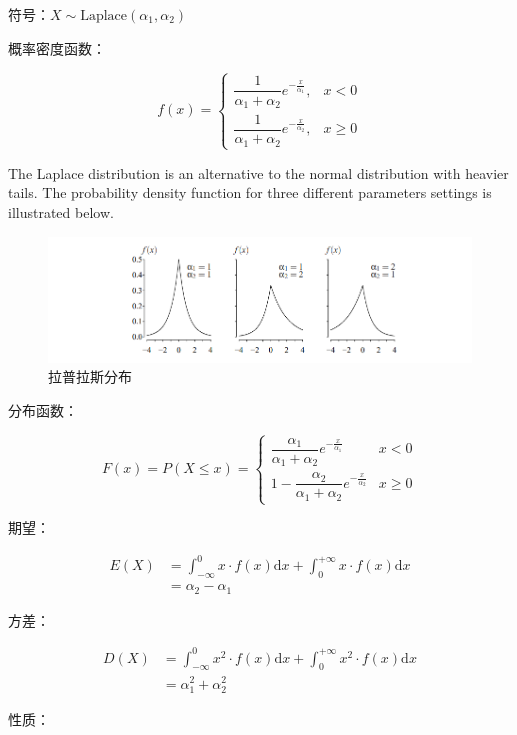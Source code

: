 \documentclass[12pt, a4paper, oneside]{ctexbook}
\begin{document}
 符号：$X \sim \text{Laplace}(\alpha_1, \alpha_2)$

 概率密度函数：

$$
f(x) = \begin{cases}
\dfrac{1}{\alpha_1 + \alpha_2}e^{-\frac{x}{\alpha_1}}, &x < 0 \\
\dfrac{1}{\alpha_1 + \alpha_2}e^{-\frac{x}{\alpha_2}}, & x \geq 0
\end{cases}
$$

The Laplace distribution is an alternative to the normal distribution with heavier tails. The probability density function for three different parameters settings is illustrated below.

\begin{figure}[H]
  \centering
  \includegraphics[width=1\textwidth]{image/拉普拉斯分布.png}
  \caption{拉普拉斯分布}
  \label{fig:example}
\end{figure}

 分布函数：

$$
F(x) = P(X \leq x) = \begin{cases}
\dfrac{\alpha_1}{\alpha_1 + \alpha_2}e^{-\frac{x}{\alpha_1}} &x < 0 \\
1 - \dfrac{\alpha_2}{\alpha_1 + \alpha_2}e^{-\frac{x}{\alpha_2}}&x \geq 0
\end{cases}
$$

 期望：

$$
\begin{aligned}
E(X) &= \int_{-\infty}^{0} x \cdot f(x)\mathrm{d}x + \int_0^{+\infty} x \cdot f(x) \mathrm{d}x\\
&= \alpha_2 - \alpha_1
\end{aligned}
$$

 方差：

$$
\begin{aligned}
D(X) &= \int_{-\infty}^{0} x^2 \cdot f(x)\mathrm{d}x + \int_0^{+\infty} x^2 \cdot f(x) \mathrm{d}x\\
&= \alpha_1^{2} + \alpha_2^{2}
\end{aligned}
$$

 性质：
\end{document}
